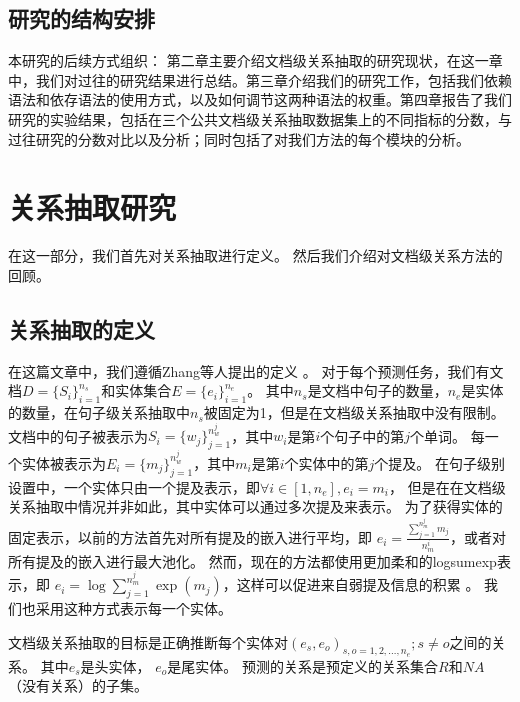 \documentclass[bachelor]{thesis-uestc}
\begin{document}
\section{研究的结构安排}
本研究的后续方式组织： 第二章主要介绍文档级关系抽取的研究现状，在这一章中，我们对过往的研究结果进行总结。第三章介绍我们的研究工作，包括我们依赖语法和依存语法的使用方式，以及如何调节这两种语法的权重。第四章报告了我们研究的实验结果，包括在三个公共文档级关系抽取数据集上的不同指标的分数，与过往研究的分数对比以及分析；同时包括了对我们方法的每个模块的分析。

\chapter{关系抽取研究}
在这一部分，我们首先对关系抽取进行定义。
然后我们介绍对文档级关系方法的回顾。
\section{关系抽取的定义}

在这篇文章中，我们遵循Zhang等人提出的定义 \cite{zhang-etal-2020-document}。
对于每个预测任务，我们有文档$D=\{S_i\}_{i=1}^{n_s}$和实体集合$E=\{e_i\}_{i=1}^{n_e}$。
其中$n_s$是文档中句子的数量，$n_e$是实体的数量，在句子级关系抽取中$n_s$被固定为1，但是在文档级关系抽取中没有限制。
文档中的句子被表示为$S_i=\{w_j\}_{j=1}^{n_w^j}$，其中$w_i$是第$i$个句子中的第$j$个单词。
每一个实体被表示为$E_i=\{m_j\}_{j=1}^{n_w^j}$，其中$m_i$是第$i$个实体中的第$j$个提及。
在句子级别设置中，一个实体只由一个提及表示，即$\forall i \in [1, n_e], e_i = m_i$， 但是在在文档级关系抽取中情况并非如此，其中实体可以通过多次提及来表示。
为了获得实体的固定表示，以前的方法首先对所有提及的嵌入进行平均，即 $e_i = \frac{\sum_{j=1}^{n_m^j} m_j}{n_m^i}$，或者对所有提及的嵌入进行最大池化。
然而，现在的方法都使用更加柔和的logsumexp表示，即 $e_i = \log \sum_{j=1}^{n_m^j} \exp(m_j)$，这样可以促进来自弱提及信息的积累 \cite{jia-etal-2019-document}。
我们也采用这种方式表示每一个实体。\par

文档级关系抽取的目标是正确推断每个实体对$(e_s,e_o)_{s,o = 1, 2, \dots, n_e}; s \neq o$之间的关系。
其中$e_s$是头实体， $e_o$是尾实体。
预测的关系是预定义的关系集合$R$和$NA$（没有关系）的子集。
\end{document}
